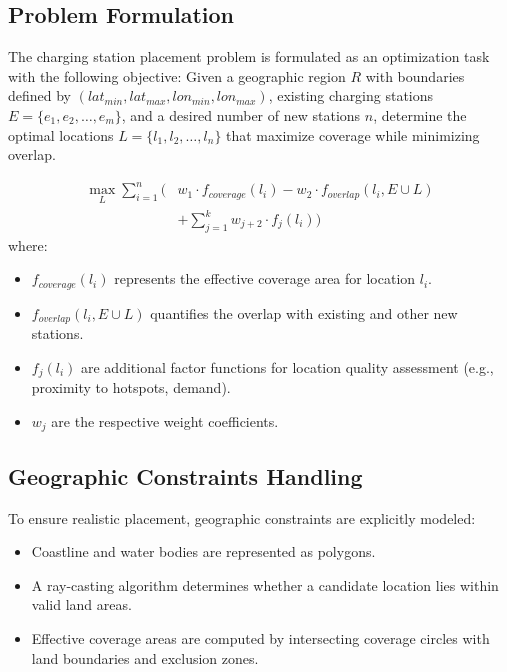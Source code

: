 \documentclass[journal]{IEEEtran}
\begin{document}
\subsection{Problem Formulation}
The charging station placement problem is formulated as an optimization task with the following objective: Given a geographic region \( R \) with boundaries defined by \((lat_{min}, lat_{max}, lon_{min}, lon_{max})\), existing charging stations \( E = \{e_1, e_2, \ldots, e_m\} \), and a desired number of new stations \( n \), determine the optimal locations \( L = \{l_1, l_2, \ldots, l_n\} \) that maximize coverage while minimizing overlap.

\begin{equation}
\begin{split}
\max_{L} \sum_{i=1}^{n} \Biggl( & w_1 \cdot f_{coverage}(l_i) - w_2 \cdot f_{overlap}(l_i, E \cup L) \\
& + \sum_{j=1}^{k} w_{j+2} \cdot f_j(l_i) \Biggr)
\end{split}
\end{equation}
where:
\begin{itemize}
    \item \( f_{coverage}(l_i) \) represents the effective coverage area for location \( l_i \).
    \item \( f_{overlap}(l_i, E \cup L) \) quantifies the overlap with existing and other new stations.
    \item \( f_j(l_i) \) are additional factor functions for location quality assessment (e.g., proximity to hotspots, demand).
    \item \( w_j \) are the respective weight coefficients.
\end{itemize}

\subsection{Geographic Constraints Handling}
To ensure realistic placement, geographic constraints are explicitly modeled:
\begin{itemize}
    \item Coastline and water bodies are represented as polygons.
    \item A ray-casting algorithm determines whether a candidate location lies within valid land areas.
    \item Effective coverage areas are computed by intersecting coverage circles with land boundaries and exclusion zones.
\end{itemize}
\end{document}
